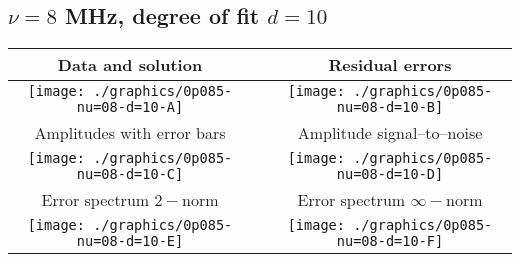 

% 

\clearpage{}
\break{}

\subsection{$\nu = 8$ MHz, degree of fit $d = 10$}

\begin{table}[h]
    \begin{center}
        \begin{tabular}{ccc}
            Data and solution & \quad & Residual errors \\\hline
            \texttt{[image: ./graphics/0p085-nu=08-d=10-A]} &&
            \texttt{[image: ./graphics/0p085-nu=08-d=10-B]} \\[15pt]
            Amplitudes with error bars && Amplitude signal--to--noise \\\hline
            \texttt{[image: ./graphics/0p085-nu=08-d=10-C]} &&
            \texttt{[image: ./graphics/0p085-nu=08-d=10-D]} \\[15pt]
            Error spectrum $2-$norm && Error spectrum $\infty-$norm \\\hline
            \texttt{[image: ./graphics/0p085-nu=08-d=10-E]} &&
            \texttt{[image: ./graphics/0p085-nu=08-d=10-F]} \\[15pt]
        \end{tabular}
    \end{center}
\label{fig:elev=85, nu=8}
\end{table}



\endinput
